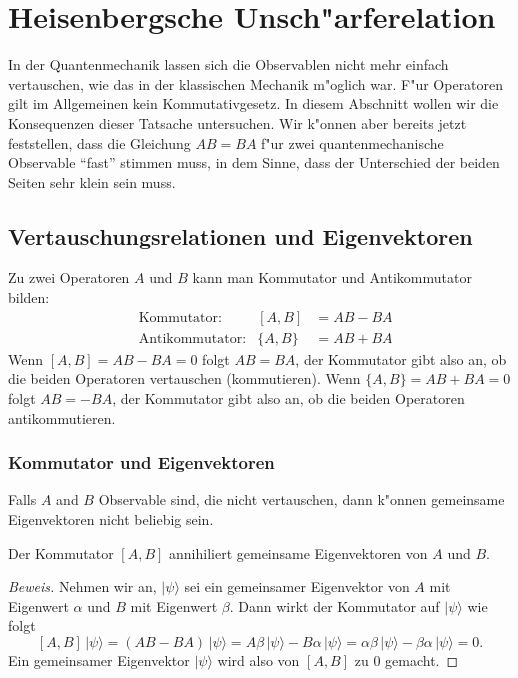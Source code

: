 \chapter{Heisenbergsche Unsch"arferelation\label{chapter:heisenberg}}
\rhead{}

In der Quantenmechanik lassen sich die Observablen nicht mehr einfach
vertauschen, wie das in der klassischen Mechanik m"oglich war.
F"ur Operatoren gilt im Allgemeinen kein Kommutativgesetz.
In diesem Abschnitt wollen wir die Konsequenzen dieser Tatsache
untersuchen.
Wir k"onnen aber bereits jetzt feststellen, dass die Gleichung
$AB=BA$ f"ur zwei quantenmechanische Observable ``fast'' stimmen
muss, in dem Sinne, dass der Unterschied der beiden Seiten sehr
klein sein muss. 

\section{Vertauschungsrelationen und Eigenvektoren}
Zu zwei Operatoren $A$ und $B$ kann man Kommutator und Antikommutator
bilden:
\[
\begin{aligned}
&\text{Kommutator:}&
[A,B]&=AB-BA
\\
&\text{Antikommutator:}&
\{A,B\}&=AB+BA
\end{aligned}
\]
Wenn $[A,B]=AB-BA=0$ folgt $AB=BA$,
der Kommutator gibt also an, ob die beiden Operatoren vertauschen (kommutieren).
Wenn $\{A,B\}=AB+BA=0$ folgt $AB=-BA$,
der Kommutator gibt also an, ob die beiden Operatoren antikommutieren.

\subsection{Kommutator und Eigenvektoren}
Falls $A$ and $B$ Observable sind, die nicht vertauschen, dann k"onnen
gemeinsame Eigenvektoren nicht beliebig sein.

\begin{hilfssatz}
\label{skript:kommutatorannihliertev}
Der Kommutator $[A,B]$ annihiliert gemeinsame Eigenvektoren von $A$ und $B$.
\end{hilfssatz}

\begin{proof}[Beweis]
Nehmen wir an, $|\psi\rangle$ sei ein gemeinsamer Eigenvektor
von $A$ mit Eigenwert $\alpha$ und $B$ mit Eigenwert $\beta$.
Dann wirkt der Kommutator auf $|\psi\rangle$ wie folgt
\[
[A,B]\,|\psi\rangle
=
(AB-BA)\,|\psi\rangle 
=
A\beta\,|\psi\rangle -B\alpha\,|\psi\rangle
=
\alpha\beta\,|\psi\rangle-\beta\alpha\,|\psi\rangle
=
0.
\]
Ein gemeinsamer Eigenvektor $|\psi\rangle$ wird also von $[A,B]$
zu $0$ gemacht.
\end{proof}

